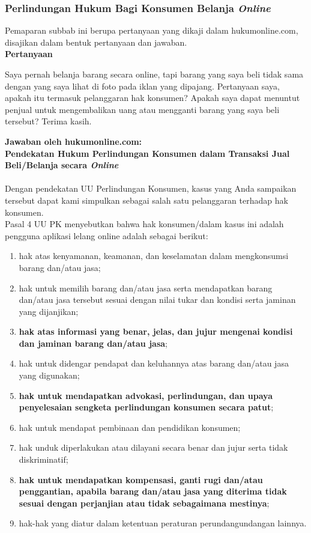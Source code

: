\subsubsection{Perlindungan Hukum Bagi Konsumen Belanja \textit{Online}}
	Pemaparan subbab ini berupa pertanyaan yang dikaji dalam hukumonline.com, disajikan dalam bentuk pertanyaan dan jawaban.\\
\textbf{Pertanyaan}
\begin{displayquote}
	Saya pernah belanja barang secara online, tapi barang yang saya beli tidak sama dengan yang saya lihat di foto pada iklan yang dipajang. Pertanyaan saya, apakah itu termasuk pelanggaran hak konsumen? Apakah saya dapat menuntut penjual untuk mengembalikan uang atau mengganti barang yang saya beli tersebut? Terima kasih.
\end{displayquote}


\textbf{Jawaban oleh hukumonline.com: \\ Pendekatan Hukum Perlindungan Konsumen dalam Transaksi Jual Beli/Belanja secara \textit{Online}} \\ \ \\
\indent Dengan pendekatan UU Perlindungan Konsumen, kasus yang Anda sampaikan tersebut dapat kami simpulkan sebagai salah satu pelanggaran terhadap hak konsumen. \\

\indent Pasal 4 UU PK menyebutkan bahwa hak konsumen/dalam kasus ini adalah pengguna aplikasi lelang online adalah sebagai berikut:
\begin{enumerate}[label=\alph*.]
	\item hak atas kenyamanan, keamanan, dan keselamatan dalam mengkonsumsi barang dan/atau jasa;
	\item hak untuk memilih barang dan/atau jasa serta mendapatkan barang dan/atau jasa tersebut sesuai dengan nilai tukar dan kondisi serta jaminan yang dijanjikan;
	\item \textbf{hak atas informasi yang benar, jelas, dan jujur mengenai kondisi dan jaminan barang dan/atau jasa};
	\item hak untuk didengar pendapat dan keluhannya atas barang dan/atau jasa yang digunakan;
	\item \textbf{hak untuk mendapatkan advokasi, perlindungan, dan upaya penyelesaian sengketa perlindungan konsumen secara patut};
	\item hak untuk mendapat pembinaan dan pendidikan konsumen;
	\item hak unduk diperlakukan atau dilayani secara benar dan jujur serta tidak diskriminatif;
	\item \textbf{hak untuk mendapatkan kompensasi, ganti rugi dan/atau penggantian, apabila barang dan/atau jasa yang diterima tidak sesuai dengan perjanjian atau tidak sebagaimana mestinya};
	\item hak-hak yang diatur dalam ketentuan peraturan perundangundangan lainnya.
\end{enumerate}

